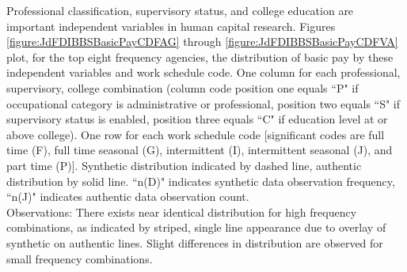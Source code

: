 \documentclass[10pt, letterpaper]{article}
\begin{document}
\begin{spacing}{1.0}
Professional classification, supervisory status, and college education are important independent variables in human capital research.  Figures \ref{figure:JdFDIBBSBasicPayCDFAG} through \ref{figure:JdFDIBBSBasicPayCDFVA} plot, for the top eight frequency agencies, the distribution of basic pay by these independent variables and work schedule code.  One column for each professional, supervisory, college combination (column code position one equals ``P" if occupational category is administrative or professional, position two equals ``S" if supervisory status is enabled, position three equals ``C" if education level at or above college).  One row for each work schedule code [significant codes are full time (F), full time seasonal (G), intermittent (I), intermittent seasonal (J), and part time (P)].  Synthetic distribution indicated by dashed line, authentic distribution by solid line.  ``n(D)" indicates synthetic data observation frequency, ``n(J)" indicates authentic data observation count.\\

Observations:  There exists near identical distribution for high frequency combinations, as indicated by striped, single line appearance due to overlay of synthetic on authentic lines.  Slight differences in distribution are observed for small frequency combinations.

\vspace{12pt}


\end{spacing}
\end{document}
